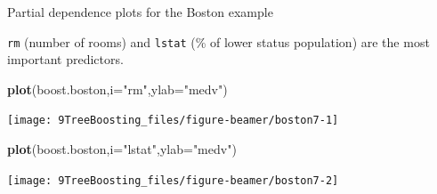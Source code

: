 \documentclass[
  10pt,
  ignorenonframetext,
]{beamer}
\newenvironment{Shaded}{\begin{snugshade}}{\end{snugshade}}
\newcommand{\AttributeTok}[1]{\textcolor[rgb]{0.13,0.29,0.53}{#1}}
\newcommand{\FunctionTok}[1]{\textcolor[rgb]{0.13,0.29,0.53}{\textbf{#1}}}
\newcommand{\NormalTok}[1]{#1}
\newcommand{\StringTok}[1]{\textcolor[rgb]{0.31,0.60,0.02}{#1}}
\begin{document}
\begin{frame}[fragile]
\begin{block}{Partial dependence plots for the Boston example}
\label{partial-dependence-plots-for-the-boston-example}
\(~\)

\texttt{rm} (number of rooms) and \texttt{lstat} (\% of lower status
population) are the most important predictors.

\vspace{2mm}

\scriptsize

\begin{Shaded}
\begin{Highlighting}[]
\FunctionTok{plot}\NormalTok{(boost.boston,}\AttributeTok{i=}\StringTok{"rm"}\NormalTok{,}\AttributeTok{ylab=}\StringTok{"medv"}\NormalTok{)}
\end{Highlighting}
\end{Shaded}

\begin{center}\texttt{[image: 9TreeBoosting\_files/figure-beamer/boston7-1]} \end{center}

\begin{Shaded}
\begin{Highlighting}[]
\FunctionTok{plot}\NormalTok{(boost.boston,}\AttributeTok{i=}\StringTok{"lstat"}\NormalTok{,}\AttributeTok{ylab=}\StringTok{"medv"}\NormalTok{)}
\end{Highlighting}
\end{Shaded}

\begin{center}\texttt{[image: 9TreeBoosting\_files/figure-beamer/boston7-2]} \end{center}
\end{block}
\end{frame}
\end{document}
